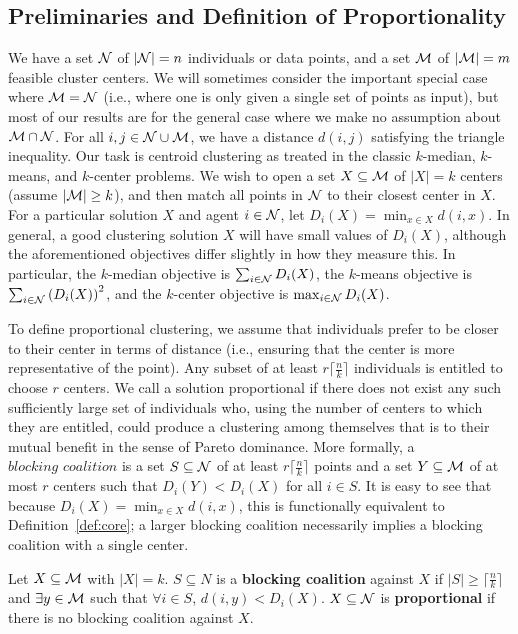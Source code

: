 
\subsection{Preliminaries and Definition of Proportionality} We have a set $\mathcal {N}$ of $|\mathcal {N}| = n$ individuals or data points, and a set $\mathcal{M}$ of $|\mathcal{M}| = m$ feasible cluster centers. We will sometimes consider the important special case where $\mathcal{M} = \mathcal {N}$ (i.e., where one is only given a single set of points as input), but most of our results are for the general case where we make no assumption about $\mathcal{M} \cap \mathcal {N}$. For all $i, j \in \mathcal {N} \cup \mathcal{M}$, we have a distance $d(i, j)$ satisfying the triangle inequality. Our task is centroid clustering as treated in the classic $k$-median, $k$-means, and $k$-center problems. We wish to open a set $X \subseteq \mathcal{M}$ of $|X| = k$ centers (assume $|\mathcal{M}| \geq k$), and then match all points in $\mathcal {N}$ to their closest center in $X$. For a particular solution $X$ and agent $i \in \mathcal {N}$, let $D_i(X) = \min_{x \in X} d(i, x)$. In general, a good clustering solution $X$ will have small values of $D_i(X)$, although the aforementioned objectives differ slightly in how they measure this. In particular, the $k$-median objective is $\sum_{i \in \mathcal {N}} D_i(X)$, the $k$-means objective is $\sum_{i \in \mathcal {N}} \left(D_i(X)\right)^2 $, and the $k$-center objective is $\max_{i \in \mathcal {N}} D_i(X)$.

To define proportional clustering, we assume that individuals prefer to be closer to their center in terms of distance (i.e., ensuring that the center is more representative of the point). Any subset of at least $r \lceil \frac{n}{k} \rceil$ individuals is entitled to choose $r$ centers. We call a solution proportional if there does not exist any such sufficiently large set of individuals who, using the number of centers to which they are entitled, could produce a clustering among themselves that is to their mutual benefit in the sense of Pareto dominance. More formally, a $\textit{blocking coalition}$ is a set $S \subseteq \mathcal {N}$ of at least $r \lceil \frac{n}{k} \rceil$ points and a set $Y \subseteq \mathcal{M}$ of at most $r$ centers such that $D_i(Y) < D_i(X)$ for all $i \in S$. It is easy to see that because $D_i(X) = \min_{x \in X} d(i, x)$, this is functionally equivalent to Definition~\ref{def:core}; a larger blocking coalition necessarily implies a blocking coalition with a single center. 

\begin{definition}
\label{def:core}
	Let $X \subseteq \mathcal{M}$ with $|X| = k$. $S \subseteq N$ is a \textbf{blocking coalition} against $X$ if $|S| \geq \lceil \frac{n}{k} \rceil$ and $\exists y \in \mathcal{M}$ such that $\forall i \in S$, $d(i, y) < D_i(X)$. 	$X \subseteq \mathcal {N}$ is \textbf{proportional} if there is no blocking coalition against $X$. 
\end{definition}

